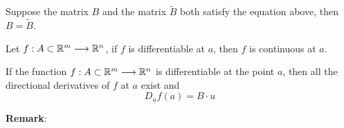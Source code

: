 \begin{theorem}
    Suppose the matrix $B$ and the matrix $\tilde{B}$ both satisfy the equation above, then $B=\tilde{B}$.
\end{theorem}


\begin{theorem}
    Let $f:A\subset\mathbb{R}^m\longrightarrow\mathbb{R}^n$, if $f$ is differentiable at $a$, then $f$ is continuous at $a$.
\end{theorem}

\begin{theorem} \label{directional derivative from jmatrix}
    If the function $f:A \subset \mathbb{R}^m \longrightarrow \mathbb{R}^n$ is differentiable at the point $a$, then all the directional derivatives of $f$ at $a$ exist and $$D_uf(a)=B\cdot u$$
\end{theorem}
\noindent \textbf{Remark}:
